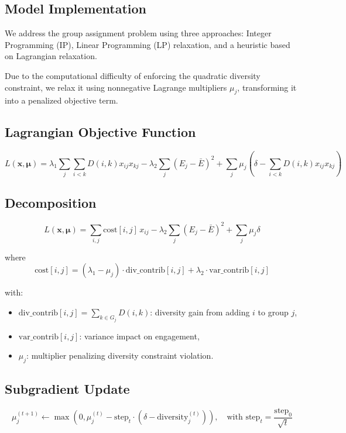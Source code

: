 \subsection*{Model Implementation}

We address the group assignment problem using three approaches: Integer Programming (IP), Linear Programming (LP) relaxation, and a heuristic based on Lagrangian relaxation.

Due to the computational difficulty of enforcing the quadratic diversity constraint, we relax it using nonnegative Lagrange multipliers $\mu_j$, transforming it into a penalized objective term.

\subsection*{Lagrangian Objective Function}

\[
L(\mathbf{x}, \boldsymbol{\mu}) = \lambda_1 \sum_j \sum_{i<k} D(i,k) x_{ij} x_{kj} - \lambda_2 \sum_j (E_j - \bar{E})^2 + \sum_j \mu_j \left( \delta - \sum_{i<k} D(i,k) x_{ij} x_{kj} \right)
\]

\subsection*{Decomposition}

\[
L(\mathbf{x}, \boldsymbol{\mu}) = \sum_{i,j} \text{cost}[i,j] \, x_{ij} - \lambda_2 \sum_j (E_j - \bar{E})^2 + \sum_j \mu_j \delta
\]

where
\[
\text{cost}[i,j] = (\lambda_1 - \mu_j) \cdot \text{div\_contrib}[i,j] + \lambda_2 \cdot \text{var\_contrib}[i,j]
\]

with:
\begin{itemize}
    \item $\text{div\_contrib}[i,j] = \sum_{k \in G_j} D(i,k)$: diversity gain from adding $i$ to group $j$,
    \item $\text{var\_contrib}[i,j]$: variance impact on engagement,
    \item $\mu_j$: multiplier penalizing diversity constraint violation.
\end{itemize}

\subsection*{Subgradient Update}

\[
\mu_j^{(t+1)} \leftarrow \max(0, \mu_j^{(t)} - \text{step}_t \cdot (\delta - \text{diversity}_j^{(t)})), \quad \text{with } \text{step}_t = \frac{\text{step}_0}{\sqrt{t}}
\]

